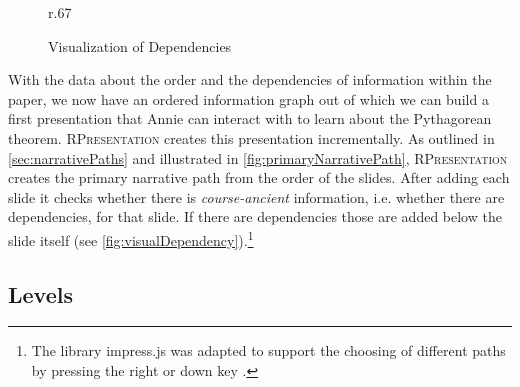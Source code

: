 \documentclass{llncs}
\newcommand{\sys}{\textsc{RPresentation}\xspace}
\begin{document}
\begin{figure}r{.67\textwidth}\vspace{-2em}
  \vspace{-1.8em}
  \caption{Visualization of Dependencies}\label{fig:visualDependency}
  \vspace{-2em}
\end{figure}
With the data about the order and the dependencies of information within the paper, we now
have an ordered information graph out of which we can build a first presentation that
Annie can interact with to learn about the Pytha\-go\-rean theorem. \sys creates this
presentation incrementally. As outlined in \autoref{sec:narrativePaths} and illustrated in
\autoref{fig:primaryNarrativePath}, \sys creates the primary narrative path from the order
of the slides. After adding each slide it checks whether there is \textit{course-ancient}
information, i.e. whether there are dependencies, for that slide. If there are
dependencies those are added below the slide itself (see
\autoref{fig:visualDependency}).\footnote{The library impress.js was adapted to support the
  choosing of different paths by pressing the right or down key
  \cite{npentrel:npentrel15}.}

\newpage
\subsection{Levels}
\label{sec:levels}
\end{document}
